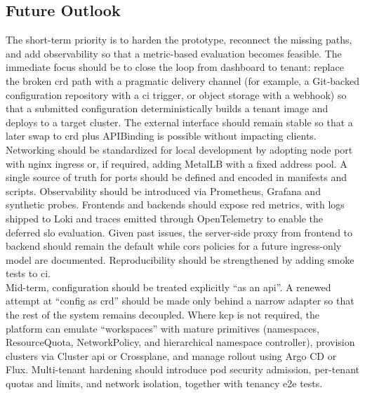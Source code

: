\documentclass[11pt, a4paper, oneside, listof=totoc]{scrartcl}
\begin{document}
        \subsection{Future Outlook}\label{subsec:outlook}
            The short-term priority is to harden the prototype, reconnect the missing paths, and add
            observability so that a metric-based evaluation becomes feasible.
            The immediate focus should be to close the loop from dashboard to tenant: replace the
            broken \gls{crd} path with a pragmatic delivery channel (for example, a Git-backed
            configuration repository with a \gls{ci} trigger, or object storage with a webhook) so
            that a submitted configuration deterministically builds a tenant image and deploys to a
            target cluster.
            The external interface should remain stable so that a later swap to \gls{crd} plus
            APIBinding is possible without impacting clients.
            Networking should be standardized for local development by adopting node port with nginx
            ingress or, if required, adding MetalLB with a fixed address pool.
            A single source of truth for ports should be defined and encoded in manifests and
            scripts.
            Observability should be introduced via Prometheus, Grafana and synthetic probes.
            Frontends and backends should expose \gls{red} metrics, with logs shipped to Loki and
            traces emitted through OpenTelemetry to enable the deferred \gls{slo} evaluation.
            Given past issues, the server-side proxy from frontend to backend should remain the
            default while \gls{cors} policies for a future ingress-only model are documented.
            Reproducibility should be strengthened by adding smoke tests to \gls{ci}.\\
            Mid-term, configuration should be treated explicitly \enquote{as an \gls{api}}.
            A renewed attempt at \enquote{config as \gls{crd}} should be made only behind a narrow
            adapter so that the rest of the system remains decoupled.
            Where \gls{kcp} is not required, the platform can emulate \enquote{workspaces} with
            mature primitives (namespaces, ResourceQuota, NetworkPolicy, and hierarchical namespace
            controller), provision clusters via Cluster \gls{api} or Crossplane, and manage rollout
            using Argo CD or Flux.
            Multi-tenant hardening should introduce pod security admission, per-tenant quotas and
            limits, and network isolation, together with tenancy \gls{e2e} tests.
\end{document}
